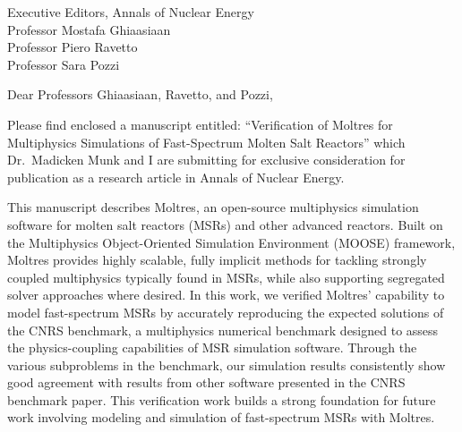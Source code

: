 \documentclass[11pt]{letter} %
\begin{document}


\begin{letter}{Executive Editors,
Annals of Nuclear Energy\\
Professor Mostafa Ghiaasiaan\\
Professor Piero Ravetto\\
Professor Sara Pozzi}


\address{Sun Myung Park\\
University of Illinois\\
226 Talbot Laboratory\\
MC-234\\
104 S. Wright Street\\
Urbana, IL 61801}




\opening{Dear Professors Ghiaasiaan, Ravetto, and Pozzi,}

Please find enclosed a manuscript entitled: ``Verification of Moltres for
Multiphysics Simulations of Fast-Spectrum Molten Salt Reactors'' which
Dr.\ Madicken Munk and I are submitting for exclusive
consideration for publication as a research article in Annals of Nuclear
Energy.

This manuscript describes Moltres, an open-source multiphysics simulation
software for molten salt reactors (MSRs) and other advanced reactors.
Built on the Multiphysics Object-Oriented Simulation Environment (MOOSE)
framework, Moltres provides highly scalable, fully implicit methods
for tackling strongly coupled multiphysics typically found in MSRs, while also
supporting segregated solver approaches where desired. In this work,
we verified Moltres' capability to model fast-spectrum MSRs by
accurately reproducing the expected solutions of the CNRS benchmark, a
multiphysics numerical benchmark designed to assess the physics-coupling
capabilities of MSR simulation software. Through the various subproblems in the
benchmark, our simulation results consistently show good agreement with
results from other software presented in the CNRS benchmark paper. This
verification work builds a strong foundation for future work involving
modeling and simulation of fast-spectrum MSRs with Moltres.


\end{letter}
\end{document}
